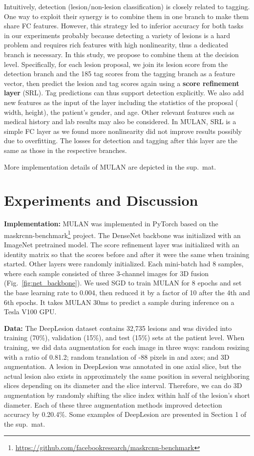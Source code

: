 \documentclass[runningheads]{llncs}
\def\Fig#1{{Fig.\ \ref{fig:#1}}}
\begin{document}
Intuitively, detection (lesion/non-lesion classification) is closely related to tagging. One way to exploit their synergy is to combine them in one branch to make them share FC features. However, this strategy led to inferior accuracy for both tasks in our experiments probably because detecting a variety of lesions is a hard problem and requires rich features with high nonlinearity, thus a dedicated branch is necessary. In this study, we propose to combine them at the decision level. Specifically, for each lesion proposal, we join its lesion score from the detection branch and the 185 tag scores from the tagging branch as a feature vector, then predict the lesion and tag scores again using a \textbf{score refinement layer} (SRL). Tag predictions can thus support detection explicitly. We also add new features as the input of the layer including the statistics of the proposal ( width, height), the patient's gender, and age. Other relevant features such as medical history and lab results may also be considered. In MULAN, SRL is a simple FC layer as we found more nonlinearity did not improve results possibly due to overfitting. The losses for detection and tagging after this layer are the same as those in the respective branches.

More implementation details of MULAN are depicted in the sup.\ mat.

\section{Experiments and Discussion}

\textbf{Implementation:} MULAN was implemented in PyTorch based on the maskrcnn-benchmark\footnote[2]{\url{https://github.com/facebookresearch/maskrcnn-benchmark}} project. The DenseNet backbone was initialized with an ImageNet pretrained model. The score refinement layer was initialized with an identity matrix so that the scores before and after it were the same when training started. Other layers were randomly initialized. Each mini-batch had 8 samples, where each sample consisted of three 3-channel images for 3D fusion (\Fig{net_backbone}). We used SGD to train MULAN for 8 epochs and set the base learning rate to 0.004, then reduced it by a factor of 10 after the 4th and 6th epochs. It takes MULAN 30ms to predict a sample during inference on a Tesla V100 GPU.

\textbf{Data:} The DeepLesion dataset \cite{Yan2018DeepLesion} contains 32,735 lesions and was divided into training (70\%), validation (15\%), and test (15\%) sets at the patient level. When training, we did data augmentation for each image in three ways: random resizing with a ratio of 0.81.2; random translation of -88 pixels in  and  axes; and 3D augmentation. A lesion in DeepLesion was annotated in one axial slice, but the actual lesion also exists in approximately the same position in several neighboring slices depending on its diameter and the slice interval. Therefore, we can do 3D augmentation by randomly shifting the slice index within half of the lesion's short diameter. Each of these three augmentation methods improved detection accuracy by 0.20.4\%. Some examples of DeepLesion are presented in Section 1 of the sup.\ mat.
\end{document}
